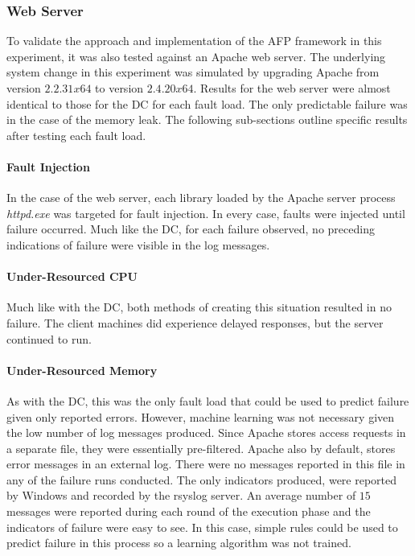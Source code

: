 \subsubsection{Web Server}
To validate the approach and implementation of the \ac{AFP} framework in this
experiment, it was also tested against an Apache web server.  The underlying
system change in this experiment was simulated by upgrading Apache from version
$2.2.31 x64$ to version $2.4.20 x64$.  Results for the web server were almost
identical to those for the \ac{DC} for each fault load.  The only predictable
failure was in the case of the memory leak.  The following sub-sections outline
specific results after testing each fault load.

\paragraph{Fault Injection}
In the case of the web server, each library loaded by the Apache server process
\emph{httpd.exe} was targeted for fault injection.  In every case, faults were
injected until failure occurred.  Much like the \ac{DC}, for each failure
observed, no preceding indications of failure were visible in the log messages.

\paragraph{Under-Resourced CPU}
Much like with the \ac{DC}, both methods of creating this situation resulted in
no failure.  The client machines did experience delayed responses, but the
server continued to run.

\paragraph{Under-Resourced Memory}
As with the \ac{DC}, this was the only fault load that could be used to predict
failure given only reported errors.  However, machine learning was not
necessary given the low number of log messages produced.  Since Apache stores
access requests in a separate file, they were essentially pre-filtered.  Apache
also by default, stores error messages in an external log.  There were no
messages reported in this file in any of the failure runs conducted.  The only
indicators produced, were reported by Windows and recorded by the rsyslog
server.  An average number of $15$ messages were reported during each round of
the execution phase and the indicators of failure were easy to see.  In this
case, simple rules could be used to predict failure in this process so a
learning algorithm was not trained.  

